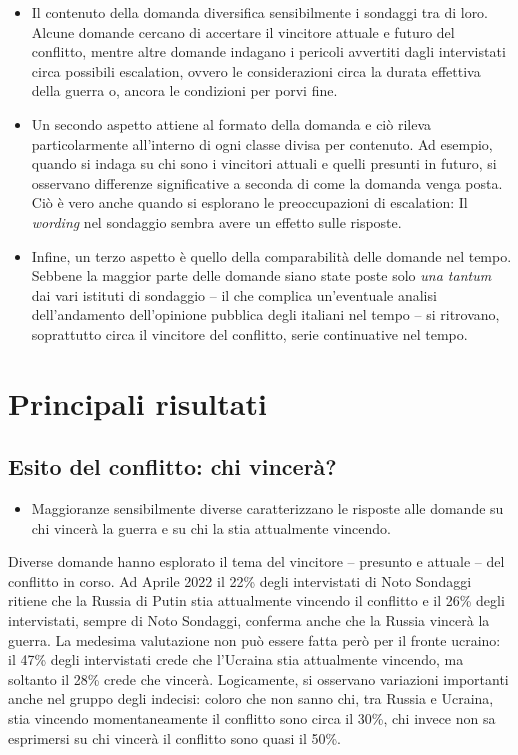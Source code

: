 \documentclass[
  openany]{book}
\providecommand{\tightlist}{%
  \setlength{\itemsep}{0pt}\setlength{\parskip}{0pt}}
\begin{document}
\begin{itemize}
\item
  Il contenuto della domanda diversifica sensibilmente i sondaggi tra di loro. Alcune domande cercano di accertare il vincitore attuale e futuro del conflitto, mentre altre domande indagano i pericoli avvertiti dagli intervistati circa possibili escalation, ovvero le considerazioni circa la durata effettiva della guerra o, ancora le condizioni per porvi fine.
\item
  Un secondo aspetto attiene al formato della domanda e ciò rileva particolarmente all'interno di ogni classe divisa per contenuto. Ad esempio, quando si indaga su chi sono i vincitori attuali e quelli presunti in futuro, si osservano differenze significative a seconda di come la domanda venga posta. Ciò è vero anche quando si esplorano le preoccupazioni di escalation: Il \emph{wording} nel sondaggio sembra avere un effetto sulle risposte.
\item
  Infine, un terzo aspetto è quello della comparabilità delle domande nel tempo. Sebbene la maggior parte delle domande siano state poste solo \emph{una tantum} dai vari istituti di sondaggio -- il che complica un'eventuale analisi dell'andamento dell'opinione pubblica degli italiani nel tempo -- si ritrovano, soprattutto circa il vincitore del conflitto, serie continuative nel tempo.
\end{itemize}

\hypertarget{principali-risultati-2}{%
\section{Principali risultati}\label{principali-risultati-2}}

\hypertarget{esito-del-conflitto-chi-vinceruxe0}{%
\subsection{Esito del conflitto: chi vincerà?}\label{esito-del-conflitto-chi-vinceruxe0}}

\begin{itemize}
\tightlist
\item
  Maggioranze sensibilmente diverse caratterizzano le risposte alle domande su chi vincerà la guerra e su chi la stia attualmente vincendo.
\end{itemize}

Diverse domande hanno esplorato il tema del vincitore -- presunto e attuale -- del conflitto in corso. Ad Aprile 2022 il 22\% degli intervistati di Noto Sondaggi ritiene che la Russia di Putin stia attualmente vincendo il conflitto e il 26\% degli intervistati, sempre di Noto Sondaggi, conferma anche che la Russia vincerà la guerra. La medesima valutazione non può essere fatta però per il fronte ucraino: il 47\% degli intervistati crede che l'Ucraina stia attualmente vincendo, ma soltanto il 28\% crede che vincerà. Logicamente, si osservano variazioni importanti anche nel gruppo degli indecisi: coloro che non sanno chi, tra Russia e Ucraina, stia vincendo momentaneamente il conflitto sono circa il 30\%, chi invece non sa esprimersi su chi vincerà il conflitto sono quasi il 50\%.
\end{document}
